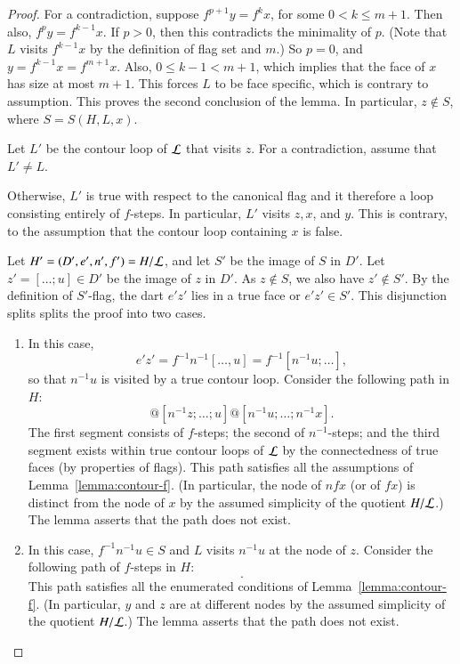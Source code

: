 \begin{proof} 
  For a contradiction, suppose $f^{p+1} y = f^k x$, for some $0<k\le
  m+1$.  Then also, $f^p y = f^{k-1} x$.  If $p>0$, then this
  contradicts the minimality of $p$.   (Note that $L$ visits $f^{k-1}x$ by the
definition of flag set and $m$.)  So $p=0$, and $y=f^{k-1} x =
  f^{m+1} x$.  Also, $0\le k-1 < {m+1}$, which implies that the face of $x$ has size at
most $m+1$.  This  forces $L$ to be face
  specific, which is contrary to assumption.  This proves the second
  conclusion of the lemma.  In particular, $z\not\in S$, where $S =
  S(H,L,x)$.

Let $L'$ be the contour loop of ${\cal L}$ that visits $z$.  For a contradiction,
assume that $L'\ne L$.

   Otherwise, $L'$ is true with respect to the canonical flag and it therefore
a loop consisting entirely of $f$-steps.  In particular, $L'$ visits $z,x$, and $y$.
This is contrary, to the assumption that the contour loop containing $x$ is false.

Let $H' = (D',e',n',f') = H/{\cal L}$, and let $S'$ be the image of $S$ in $D'$.
Let $z' = [\ldots;u]\in D'$ be the
image of $z$ in $D'$.    
As $z\not\in S$, we also have $z'\not\in S'$.
By the definition of
$S'$-flag, the dart $e'z'$ lies in a true face or $e'z'\in S'$.  
This disjunction splits
splits the proof into two cases.
\begin{enumerate}
\item{}  In this case, 
\begin{displaymath}
e'z' = f^{-1} n^{-1} [\ldots,u] = f^{-1} [n^{-1}u;\ldots],
\end{displaymath}
so that $n^{-1} u$ is visited by a true contour loop.
Consider the following
path in $H$:
\begin{displaymath}
[y;fy;\ldots;z] @ [n^{-1}z;\ldots;u] @ [n^{-1} u;\ldots;n^{-1} x].
\end{displaymath}
The first segment consists of $f$-steps; the second of $n^{-1}$-steps;
and the third segment exists within true contour loops of ${\cal L}$
by the connectedness of true faces (by properties of flags).  This
path satisfies all the assumptions of Lemma~\ref{lemma:contour-f}.  (In particular,
the node of $n f x$ (or of $f x$)  is distinct from the node of $x$ by the
assumed simplicity of the quotient $H/{\cal L}$.)
The lemma asserts that the path does not exist.
\item 
\claim {[$e'z'\in S$.]}  In this case,  
$f^{-1}n^{-1}u \in S$ and $L$ visits $n^{-1} u$ at the node of $z$.
Consider the following path of $f$-steps in $H$:
\begin{displaymath}
[y;f y;\ldots;z].
\end{displaymath}
This path satisfies all the enumerated conditions of
Lemma~\ref{lemma:contour-f}.  (In particular, $y$ and $z$ are at different nodes by
the assumed simplicity of the quotient $H/{\cal L}$.)  The lemma asserts that the path does not
exist.
\end{enumerate}
\end{proof}



